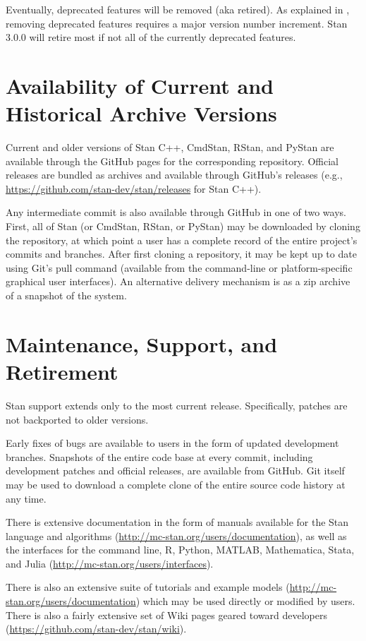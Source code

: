 Eventually, deprecated features will be removed (aka retired).  As
explained in , removing deprecated
features requires a major version number increment.  Stan 3.0.0 will
retire most if not all of the currently deprecated features.




\section{Availability of Current and Historical Archive Versions}

Current and older versions of Stan C++, CmdStan, RStan, and PyStan are
available through the GitHub pages for the corresponding repository.
Official releases are bundled as archives and available through
GitHub's releases (e.g.,
\url{https://github.com/stan-dev/stan/releases} for Stan C++).

Any intermediate commit is also available through GitHub in one of two
ways. First, all of Stan (or CmdStan, RStan, or PyStan) may be
downloaded by cloning the repository, at which point a user has a
complete record of the entire project's commits and branches. After
first cloning a repository, it may be kept up to date using Git's pull
command (available from the command-line or platform-specific
graphical user interfaces).   An alternative delivery mechanism is as
a zip archive of a snapshot of the system.

\section{Maintenance, Support, and Retirement}

Stan support extends only to the most current release. Specifically,
patches are not backported to older versions.

Early fixes of bugs are available to users in the form of updated
development branches. Snapshots of the entire code base at every
commit, including development patches and official releases, are
available from GitHub.  Git itself may be used to download a complete
clone of the entire source code history at any time.

There is extensive documentation in the form of manuals available for
the Stan language and algorithms
(\url{http://mc-stan.org/users/documentation}), as well as the
interfaces for the command line, R, Python, MATLAB, Mathematica,
Stata, and Julia (\url{http://mc-stan.org/users/interfaces}).

There is also an extensive suite of tutorials and example models
(\url{http://mc-stan.org/users/documentation}) which may be used directly or
modified by users. There is also a fairly extensive set of Wiki pages
geared toward developers
(\url{https://github.com/stan-dev/stan/wiki}).

